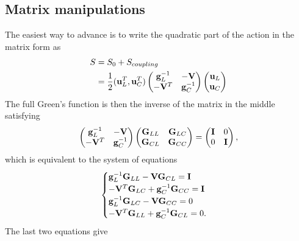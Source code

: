 \subsection{Matrix manipulations}
The easiest way to advance is to write the quadratic part of the action in the matrix form as
\begin{alignat}{2}
 S &= S_0 + S_{coupling}	\\
  &= \frac{1}{2} (\mathbf{u}_L^T,\mathbf{u}_C^T ) \left(\begin{matrix}
     \mathbf{g}_L^{-1} & -\mathbf{V} \\
       -\mathbf{V}^T & \mathbf{g}_C^{-1} \\
     \end{matrix}\right)\left(\begin{matrix} \mathbf{u}_{L} \\ \mathbf{u}_{C} \end{matrix} \right) 
\end{alignat}
The full Green's function is then the inverse of the matrix in the middle satisfying
\begin{equation}
 \left(\begin{matrix}
     \mathbf{g}_L^{-1} & -\mathbf{V} \\
       -\mathbf{V}^T & \mathbf{g}_C^{-1} \\
     \end{matrix}\right) 
\left(\begin{matrix}
     \mathbf{G}_{LL} & \mathbf{G}_{LC} \\
       \mathbf{G}_{CL} & \mathbf{G}_{CC} \\
     \end{matrix}\right)
 = \left(\begin{matrix}
     \mathbf{I} & 0 \\
       0 & \mathbf{I} \\
     \end{matrix}\right),
\end{equation}
which is equivalent to the system of equations
\begin{equation}
 \begin{cases}
  \mathbf{g}_L^{-1}\mathbf{G}_{LL}-\mathbf{V}\mathbf{G}_{CL} = \mathbf{I} \\
  -\mathbf{V}^T\mathbf{G}_{LC} + \mathbf{g}_C^{-1}\mathbf{G}_{CC} = \mathbf{I} \\
  \mathbf{g}_L^{-1}\mathbf{G}_{LC} - \mathbf{V} \mathbf{G}_{CC} = 0 \\
  -\mathbf{V}^T\mathbf{G}_{LL} + \mathbf{g}_C^{-1}\mathbf{G}_{CL} = 0.
 \end{cases}
\end{equation}
The last two equations give 
